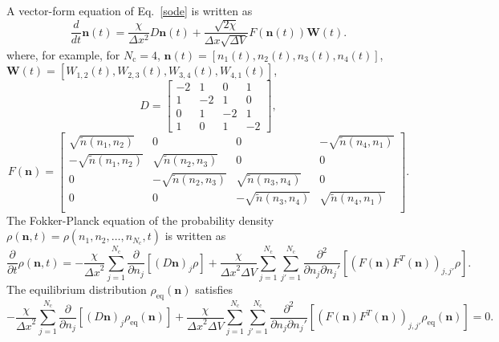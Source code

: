 \documentclass{article}
\newcommand{\dx}{{\Delta x}}
\newcommand{\dV}{{\Delta V}}
\newcommand{\Nc}{{N_\mathrm{c}}}
\begin{document}
A vector-form equation of Eq.~\eqref{sode} is written as
\begin{equation}
\frac{d}{dt}\mathbf{n}(t)=\frac{\chi}{\Delta x^2}D\mathbf{n}(t)+\frac{\sqrt{2\chi}}{\dx\sqrt{\dV}}F(\mathbf{n}(t))\mathbf{W}(t).
\end{equation}
where, for example, for $\Nc=4$, $\mathbf{n}(t)=\left[n_1(t),n_2(t),n_3(t),n_4(t)\right]$, $\mathbf{W}(t)=\left[W_{1,2}(t),W_{2,3}(t),W_{3,4}(t),W_{4,1}(t)\right]$,
\begin{equation}
D=\left[
\begin{array}{cccc}
-2 & 1 & 0 & 1 \\
1 & -2 & 1 & 0 \\
0 & 1 & -2 & 1 \\
1 & 0 & 1 & -2
\end{array}
\right],
\end{equation}
\begin{equation}
F(\mathbf{n})=\left[
\begin{array}{cccc}
\sqrt{\tilde{n}(n_1,n_2)} & 0 & 0 & -\sqrt{\tilde{n}(n_4,n_1)} \\
-\sqrt{\tilde{n}(n_1,n_2)} & \sqrt{\tilde{n}(n_2,n_3)} & 0 & 0 \\
0 & -\sqrt{\tilde{n}(n_2,n_3)} & \sqrt{\tilde{n}(n_3,n_4)} & 0 \\
0 & 0 & -\sqrt{\tilde{n}(n_3,n_4)} & \sqrt{\tilde{n}(n_4,n_1)} \\
\end{array}
\right].
\end{equation}
The Fokker-Planck equation of the probability density $\rho(\mathbf{n},t)=\rho(n_1,n_2,\dots,n_\Nc,t)$ is written as
\begin{equation}
\frac{\partial}{\partial t}\rho(\mathbf{n},t)
=-\frac{\chi}{\dx^2}\sum_{j=1}^\Nc \frac{\partial}{\partial n_j}\left[(D\mathbf{n})_j\rho\right]
+\frac{\chi}{\dx^2\dV}\sum_{j=1}^\Nc\sum_{j'=1}^\Nc \frac{\partial^2}{\partial n_j\partial n_j'}\left[\left(F(\mathbf{n})F^T(\mathbf{n})\right)_{j,j'}\rho\right].
\end{equation}
The equilibrium distribution $\rho_\mathrm{eq}(\mathbf{n})$ satisfies
\begin{equation}
\label{FKE_eq}
-\frac{\chi}{\dx^2}\sum_{j=1}^\Nc \frac{\partial}{\partial n_j}\left[(D\mathbf{n})_j\rho_\mathrm{eq}(\mathbf{n})\right]
+\frac{\chi}{\dx^2\dV}\sum_{j=1}^\Nc\sum_{j'=1}^\Nc \frac{\partial^2}{\partial n_j\partial n_j'}\left[\left(F(\mathbf{n})F^T(\mathbf{n})\right)_{j,j'}\rho_\mathrm{eq}(\mathbf{n})\right]=0.
\end{equation}
\end{document}
